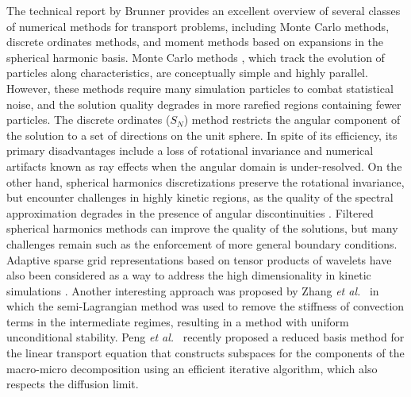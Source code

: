 \documentclass[onefignum,onetabnum]{siamart220329}
\newcommand{\etal}{\textit{et al.}~}
\begin{document}
The technical report by Brunner \cite{Brunner2002} provides an excellent overview of several classes of numerical methods for transport problems, including Monte Carlo methods, discrete ordinates methods, and moment methods based on expansions in the spherical harmonic basis. Monte Carlo methods \cite{vassiliev2017mc,dimarco2018APMC,krotz2023hybrid}, which track the evolution of particles along characteristics, are conceptually simple and highly parallel. However, these methods require many simulation particles to combat statistical noise, and the solution quality degrades in more rarefied regions containing fewer particles. The discrete ordinates ($S_{N}$) \cite{MillerLewis93,azmy2010advances} method restricts the angular component of the solution to a set of directions on the unit sphere. In spite of its efficiency, its primary disadvantages include a loss of rotational invariance and numerical artifacts known as ray effects when the angular domain is under-resolved. On the other hand, spherical harmonics discretizations \cite{McClarrenTRTEspherical2008} preserve the rotational invariance, but encounter challenges in highly kinetic regions, as the quality of the spectral approximation degrades in the presence of angular discontinuities \cite{McClarrenTRTEspherical2008}. Filtered spherical harmonics methods \cite{mcclarren2010robust,frank2016convergence} can improve the quality of the solutions, but many challenges remain such as the enforcement of more general boundary conditions. Adaptive sparse grid representations based on tensor products of wavelets have also been considered as a way to address the high dimensionality in kinetic simulations \cite{GrellaSchwab,GuoChengSparseGridDG2016,GuoChengSparseGridDG2017}. Another interesting approach was proposed by Zhang \etal \cite{zhang2023asymptotic} in which the semi-Lagrangian method was used to remove the stiffness of convection terms in the intermediate regimes, resulting in a method with uniform unconditional stability. Peng \etal \cite{peng2024RBM} recently proposed a reduced basis method for the linear transport equation that constructs subspaces for the components of the macro-micro decomposition using an efficient iterative algorithm, which also respects the diffusion limit.
 
\end{document}
